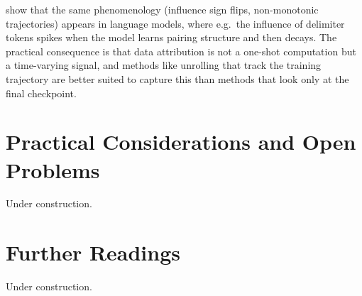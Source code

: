 \documentclass[11pt]{article}
\begin{document}
\begin{remark}\label{rem:developmental}
  \citet{lee2025stagewise} show that the same phenomenology (influence sign flips, non-monotonic trajectories) appears in language models, where e.g.\ the influence of delimiter tokens spikes when the model learns pairing structure and then decays. The practical consequence is that data attribution is not a one-shot computation but a time-varying signal, and methods like unrolling that track the training trajectory are better suited to capture this than methods that look only at the final checkpoint.
\end{remark}


\section{Practical Considerations and Open Problems}\label{sec:practical}

Under construction.




\section{Further Readings}\label{sec:further}

Under construction.




\begin{pdfonly}
\end{pdfonly}



\begin{pdfonly}\end{pdfonly}




\begin{pdfonly}\end{pdfonly}




\begin{pdfonly}\end{pdfonly}
\end{document}
